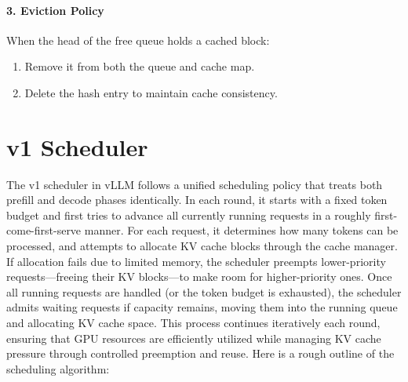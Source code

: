 \paragraph{3. Eviction Policy}
When the head of the free queue holds a cached block:
\begin{enumerate}
    \item Remove it from both the queue and cache map.
    \item Delete the hash entry to maintain cache consistency.
\end{enumerate}

\section{v1 Scheduler}
The v1 scheduler in vLLM follows a unified scheduling policy that treats both prefill and decode phases identically. In each round, it starts with a fixed token budget and first tries to advance all currently running requests in a roughly first-come-first-serve manner. For each request, it determines how many tokens can be processed, and attempts to allocate KV cache blocks through the cache manager. If allocation fails due to limited memory, the scheduler preempts lower-priority requests—freeing their KV blocks—to make room for higher-priority ones. Once all running requests are handled (or the token budget is exhausted), the scheduler admits waiting requests if capacity remains, moving them into the running queue and allocating KV cache space. This process continues iteratively each round, ensuring that GPU resources are efficiently utilized while managing KV cache pressure through controlled preemption and reuse. Here is a rough outline of the scheduling algorithm:


